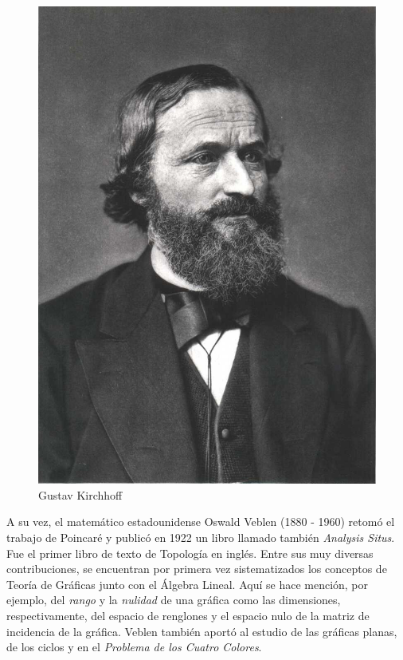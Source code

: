 \begin{figure}
    \centering
    \includegraphics[scale=0.23]{img/imgintro/kirchoff.jpg}
    \caption{Gustav Kirchhoff}
    \label{fig:veblen}
\end{figure}

A su vez, el matemático estadounidense Oswald Veblen (1880 - 1960) retomó el trabajo de Poincaré y publicó en 1922 un libro llamado también \textit{Analysis Situs}. Fue el primer libro de texto de Topología en inglés. Entre sus muy diversas contribuciones, se encuentran por primera vez sistematizados los conceptos de Teoría de Gráficas junto con el Álgebra Lineal. Aquí se hace mención, por ejemplo, del \textit{rango} y la \textit{nulidad} de una gráfica como las dimensiones, respectivamente, del espacio de renglones y el espacio nulo de la matriz de incidencia de la gráfica. Veblen también aportó al estudio de las gráficas planas, de los ciclos y en el \textit{Problema de los Cuatro Colores}.


